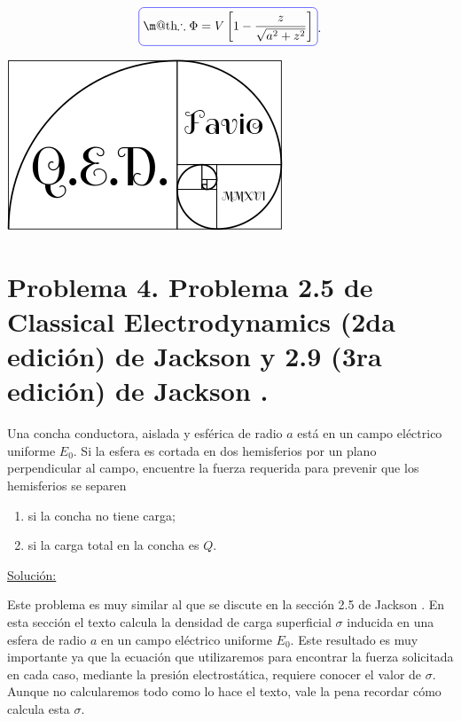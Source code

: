 \documentclass[a4paper,10pt]{article}
\makeatletter
\numberwithin{equation}{section}
\newcommand*{\boxcolor}{blue}
\renewcommand{\boxed}[1]{\textcolor{\boxcolor}{%
\tikz[baseline={([yshift=-1ex]current bounding box.center)}] \node [rectangle, minimum width=1ex,rounded corners,draw] {\normalcolor\m@th$\displaystyle#1$};}}
\makeatother
\begin{document}
\begin{equation}
 \boxed{\therefore \Phi = V \left[1 - \frac{z}{\sqrt{a^2 + z^2}} \right]}.
\end{equation}

\hspace{10cm}\includegraphics[scale=0.2]{logoQED}

\section{Problema 4. Problema 2.5 de Classical Electrodynamics (2da edición) de Jackson 
\cite{jackson2} y 2.9 (3ra edición) de Jackson \cite{jackson3}.}

Una concha conductora, aislada y esférica de radio $a$ está en un campo eléctrico 
uniforme $E_0$. Si la esfera es cortada en dos hemisferios por un plano perpendicular 
al campo, encuentre la fuerza requerida para prevenir que los hemisferios se 
separen 

\begin{enumerate}[label=\textbf{(\alph*)}]
 \item si la concha no tiene carga;
 \item si la carga total en la concha es $Q$.
\end{enumerate}

\vspace{.3cm}

\underline{Solución:} \vspace{.3cm}

Este problema es muy similar al que se discute en la sección 2.5 de Jackson \cite{jackson3}. En 
esta sección el texto calcula la densidad de carga superficial $\sigma$ inducida en una esfera de radio 
$a$ en un campo eléctrico uniforme $E_0$. Este resultado es muy importante ya que 
la ecuación que utilizaremos para encontrar la fuerza solicitada en cada caso, 
mediante la presión electrostática, requiere conocer el valor de $\sigma$. Aunque 
no calcularemos todo como lo hace el texto, vale la pena recordar cómo calcula 
esta $\sigma$.
\end{document}
